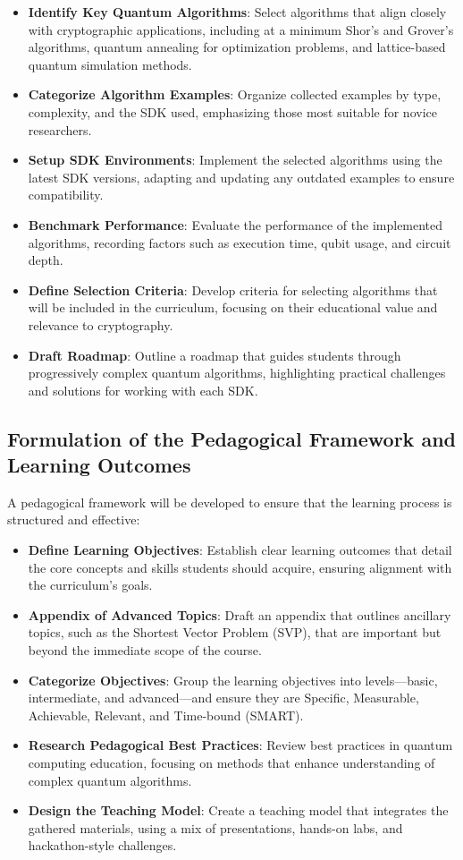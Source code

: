 \documentclass[11pt,a4paper]{article}
\begin{document}
\begin{itemize}
	\item \textbf{Identify Key Quantum Algorithms}: Select algorithms that align closely with cryptographic applications, including at a minimum 
		Shor’s and Grover’s algorithms, quantum annealing for optimization problems, and lattice-based quantum simulation methods.
	\item \textbf{Categorize Algorithm Examples}: Organize collected examples by type, complexity, and the SDK used, emphasizing those most 
		suitable for novice researchers.
	\item \textbf{Setup SDK Environments}: Implement the selected algorithms using the latest SDK versions, adapting and updating any outdated 
		examples to ensure compatibility.
	\item \textbf{Benchmark Performance}: Evaluate the performance of the implemented algorithms, recording factors such as execution time, 
		qubit usage, and circuit depth.
	\item \textbf{Define Selection Criteria}: Develop criteria for selecting algorithms that will be included in the curriculum, focusing 
		on their educational value and relevance to cryptography.
	\item \textbf{Draft Roadmap}: Outline a roadmap that guides students through progressively complex quantum algorithms, highlighting practical 
		challenges and solutions for working with each SDK.
\end{itemize}

\subsection{Formulation of the Pedagogical Framework and Learning Outcomes}

A pedagogical framework will be developed to ensure that the learning process is structured and effective:

\begin{itemize}
	\item \textbf{Define Learning Objectives}: Establish clear learning outcomes that detail the core concepts and skills students should 
		acquire, ensuring alignment with the curriculum’s goals.
	\item \textbf{Appendix of Advanced Topics}: Draft an appendix that outlines ancillary topics, such as the Shortest Vector Problem (SVP), 
		that are important but beyond the immediate scope of the course.
	\item \textbf{Categorize Objectives}: Group the learning objectives into levels—basic, intermediate, and advanced—and ensure they are 
		Specific, Measurable, Achievable, Relevant, and Time-bound (SMART).
	\item \textbf{Research Pedagogical Best Practices}: Review best practices in quantum computing education, focusing on methods that enhance 
		understanding of complex quantum algorithms.
	\item \textbf{Design the Teaching Model}: Create a teaching model that integrates the gathered materials, using a mix of presentations, 
		hands-on labs, and hackathon-style challenges.
\end{itemize}
\end{document}
